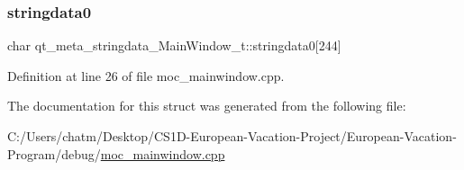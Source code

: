 \mbox{\label{structqt__meta__stringdata___main_window__t_ae7676ba302a2234a4156c1a3beec30ad}} 
\subsubsection{\texorpdfstring{stringdata0}{stringdata0}}
{\footnotesize\ttfamily char qt\+\_\+meta\+\_\+stringdata\+\_\+\+Main\+Window\+\_\+t\+::stringdata0\mbox{[}244\mbox{]}}



Definition at line 26 of file moc\+\_\+mainwindow.\+cpp.



The documentation for this struct was generated from the following file\+:\begin{DoxyCompactItemize}
\item 
C\+:/\+Users/chatm/\+Desktop/\+C\+S1\+D-\/\+European-\/\+Vacation-\/\+Project/\+European-\/\+Vacation-\/\+Program/debug/\mbox{\hyperlink{moc__mainwindow_8cpp}{moc\+\_\+mainwindow.\+cpp}}\end{DoxyCompactItemize}
